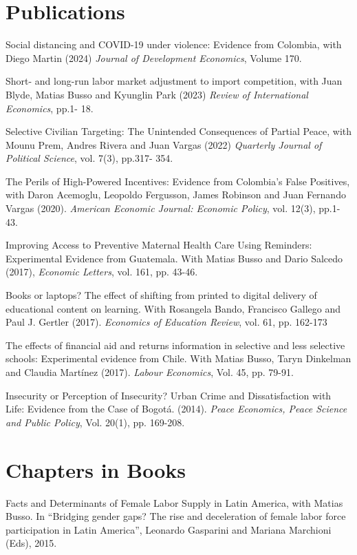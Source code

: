 \documentclass{moderncv}
\begin{document}
\section{\textbf{Publications}}

{Social distancing and COVID-19 under violence: Evidence from Colombia, with Diego Martin (2024) \emph{Journal of Development Economics}, Volume 170. \\}

{Short- and long-run labor market adjustment to import competition, with Juan Blyde, Matias Busso and Kyunglin Park (2023) \emph{Review of International Economics}, pp.1- 18. \\}

{Selective Civilian Targeting: The Unintended Consequences of Partial Peace, with Mounu Prem, Andres Rivera and Juan Vargas (2022) \emph{Quarterly Journal of Political Science}, vol. 7(3), pp.317- 354. \\}

{The Perils of High-Powered Incentives: Evidence from Colombia's False Positives, with Daron Acemoglu, Leopoldo Fergusson, James Robinson and Juan Fernando Vargas (2020). \emph{American Economic Journal: Economic Policy}, vol. 12(3), pp.1- 43. \\ }  

{Improving Access to Preventive Maternal Health Care Using Reminders: Experimental Evidence from Guatemala. With Matias Busso and Dario Salcedo (2017), \emph{Economic Letters}, vol. 161, pp. 43-46.\\} 

{Books or laptops? The effect of shifting from printed to digital delivery of educational content on learning. With Rosangela Bando, Francisco Gallego and Paul J. Gertler (2017). \emph{Economics of Education Review}, vol. 61, pp. 162-173\\} 

{The effects of financial aid and returns information in selective and less selective schools: Experimental evidence from Chile. With Matias Busso, Taryn Dinkelman and Claudia Martínez (2017). \emph{Labour Economics}, Vol. 45, pp. 79-91.\\}

{Insecurity or Perception of Insecurity? Urban Crime and Dissatisfaction with Life: Evidence from the Case of Bogot\'a. (2014). \emph{Peace Economics, Peace Science and Public Policy}, Vol. 20(1), pp. 169-208.}

\section{\textbf{Chapters in Books}}
{Facts and Determinants of Female Labor Supply in Latin America, with Matias Busso. In “Bridging gender gaps? The rise and deceleration of female labor force participation in Latin America”, Leonardo Gasparini and Mariana Marchioni (Eds), 2015.}
\end{document}
